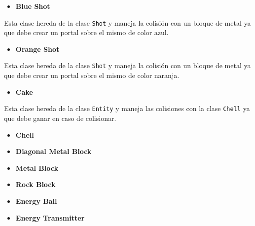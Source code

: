 \documentclass[a4paper]{article}
\begin{document}
\begin{itemize}
	\item \textbf{Blue Shot}
\end{itemize}

Esta clase hereda de la clase \texttt{Shot} y maneja la colisión con un bloque de metal ya que debe crear un portal sobre el mismo de color azul.

\begin{itemize}
	\item \textbf{Orange Shot}
\end{itemize}

Esta clase hereda de la clase \texttt{Shot} y maneja la colisión con un bloque de metal ya que debe crear un portal sobre el mismo de color naranja.

\begin{itemize}
	\item \textbf{Cake}
\end{itemize}

Esta clase hereda de la clase \texttt{Entity} y maneja las colisiones con la clase \texttt{Chell} ya que debe ganar en caso de colisionar.

\begin{itemize}
	\item \textbf{Chell}
\end{itemize}





\begin{itemize}
	\item \textbf{Diagonal Metal Block}
\end{itemize}

\begin{itemize}
	\item \textbf{Metal Block}
\end{itemize}


\begin{itemize}
	\item \textbf{Rock Block}
\end{itemize}


\begin{itemize}
	\item \textbf{Energy Ball}
\end{itemize}

\begin{itemize}
	\item \textbf{Energy Transmitter}
\end{itemize}
\end{document}
